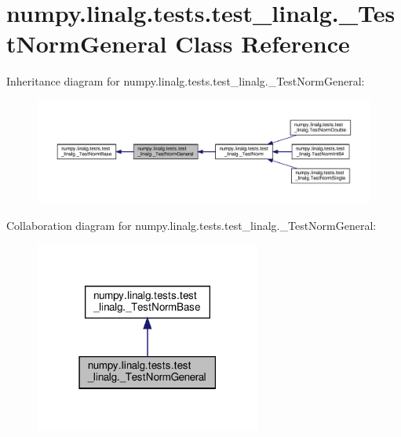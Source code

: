 \hypertarget{classnumpy_1_1linalg_1_1tests_1_1test__linalg_1_1__TestNormGeneral}{}\section{numpy.\+linalg.\+tests.\+test\+\_\+linalg.\+\_\+\+Test\+Norm\+General Class Reference}
\label{classnumpy_1_1linalg_1_1tests_1_1test__linalg_1_1__TestNormGeneral}


Inheritance diagram for numpy.\+linalg.\+tests.\+test\+\_\+linalg.\+\_\+\+Test\+Norm\+General\+:
\nopagebreak
\begin{figure}[H]
\begin{center}
\leavevmode
\includegraphics[width=350pt]{classnumpy_1_1linalg_1_1tests_1_1test__linalg_1_1__TestNormGeneral__inherit__graph}
\end{center}
\end{figure}


Collaboration diagram for numpy.\+linalg.\+tests.\+test\+\_\+linalg.\+\_\+\+Test\+Norm\+General\+:
\nopagebreak
\begin{figure}[H]
\begin{center}
\leavevmode
\includegraphics[width=210pt]{classnumpy_1_1linalg_1_1tests_1_1test__linalg_1_1__TestNormGeneral__coll__graph}
\end{center}
\end{figure}
